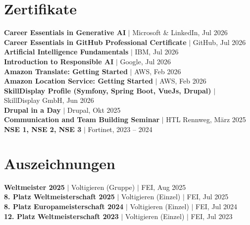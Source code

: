 \documentclass[letterpaper,11pt]{article}
\begin{document}
\section{Zertifikate}
 \begin{itemize}[leftmargin=0.15in, label={}]
    \small{\item{
     \textbf{Career Essentials in Generative AI} $|$ Microsoft \& LinkedIn, Jul 2026 \\
     \textbf{Career Essentials in GitHub Professional Certificate} $|$ GitHub, Jul 2026 \\
     \textbf{Artificial Intelligence Fundamentals} $|$ IBM, Jul 2026 \\
     \textbf{Introduction to Responsible AI} $|$ Google, Jul 2026 \\
     \textbf{Amazon Translate: Getting Started} $|$ AWS, Feb 2026 \\
     \textbf{Amazon Location Service: Getting Started} $|$ AWS, Feb 2026 \\
     \textbf{SkillDisplay Profile (Symfony, Spring Boot, VueJs, Drupal)} $|$ SkillDisplay GmbH, Jun 2026 \\
     \textbf{Drupal in a Day} $|$ Drupal, Okt 2025 \\
     \textbf{Communication and Team Building Seminar} $|$ HTL Rennweg, M\"arz 2025 \\
     \textbf{NSE 1, NSE 2, NSE 3} $|$ Fortinet, 2023 -- 2024
    }}
 \end{itemize}


\section{Auszeichnungen}
 \begin{itemize}[leftmargin=0.15in, label={}]
    \small{\item{
     \textbf{Weltmeister 2025} $|$ Voltigieren (Gruppe) $|$ FEI, Aug 2025 \\
     \textbf{8. Platz Weltmeisterschaft 2025} $|$ Voltigieren (Einzel) $|$ FEI, Jul 2025 \\
     \textbf{8. Platz Europameisterschaft 2024} $|$ Voltigieren (Einzel) $|$ FEI, Jul 2024 \\
     \textbf{12. Platz Weltmeisterschaft 2023} $|$ Voltigieren (Einzel) $|$ FEI, Jul 2023
    }}
 \end{itemize}


\end{document}
